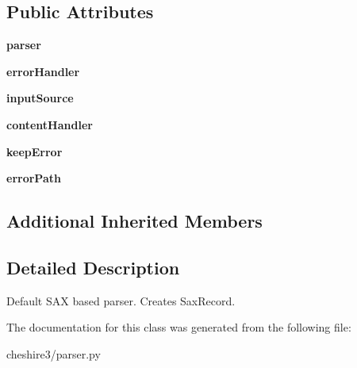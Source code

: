 \subsection*{Public Attributes}
\begin{DoxyCompactItemize}
\item 
\hypertarget{classcheshire3_1_1parser_1_1_sax_parser_a1172c3d700e364aede77114de0c00ca6}{{\bfseries parser}}\label{classcheshire3_1_1parser_1_1_sax_parser_a1172c3d700e364aede77114de0c00ca6}

\item 
\hypertarget{classcheshire3_1_1parser_1_1_sax_parser_ab022585ce4abf827ded24ae7375e1800}{{\bfseries error\-Handler}}\label{classcheshire3_1_1parser_1_1_sax_parser_ab022585ce4abf827ded24ae7375e1800}

\item 
\hypertarget{classcheshire3_1_1parser_1_1_sax_parser_a0fec0055915d4d3c7df21de64e8b3e1a}{{\bfseries input\-Source}}\label{classcheshire3_1_1parser_1_1_sax_parser_a0fec0055915d4d3c7df21de64e8b3e1a}

\item 
\hypertarget{classcheshire3_1_1parser_1_1_sax_parser_a5e71d69cf10b68e993c712fa3c910bb1}{{\bfseries content\-Handler}}\label{classcheshire3_1_1parser_1_1_sax_parser_a5e71d69cf10b68e993c712fa3c910bb1}

\item 
\hypertarget{classcheshire3_1_1parser_1_1_sax_parser_a161fd3ea50256bb535d88729aafb6c85}{{\bfseries keep\-Error}}\label{classcheshire3_1_1parser_1_1_sax_parser_a161fd3ea50256bb535d88729aafb6c85}

\item 
\hypertarget{classcheshire3_1_1parser_1_1_sax_parser_a8dc3e7b2b5233f1b9892ae36c6f55dbb}{{\bfseries error\-Path}}\label{classcheshire3_1_1parser_1_1_sax_parser_a8dc3e7b2b5233f1b9892ae36c6f55dbb}

\end{DoxyCompactItemize}
\subsection*{Additional Inherited Members}


\subsection{Detailed Description}
\begin{DoxyVerb}Default SAX based parser. Creates SaxRecord.\end{DoxyVerb}
 

The documentation for this class was generated from the following file\-:\begin{DoxyCompactItemize}
\item 
cheshire3/parser.\-py\end{DoxyCompactItemize}
